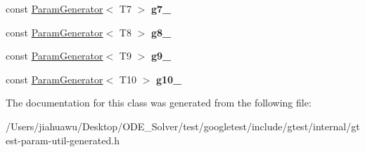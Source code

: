 \begin{DoxyCompactItemize}
const \mbox{\hyperlink{classtesting_1_1internal_1_1_param_generator}{Param\+Generator}}$<$ T7 $>$ {\bfseries g7\+\_\+}
\item 
\mbox{\label{classtesting_1_1internal_1_1_cartesian_product_generator10_a9f76ec8d21d175b1cf85099d548cb456}} 
const \mbox{\hyperlink{classtesting_1_1internal_1_1_param_generator}{Param\+Generator}}$<$ T8 $>$ {\bfseries g8\+\_\+}
\item 
\mbox{\label{classtesting_1_1internal_1_1_cartesian_product_generator10_a0bf21ea47112277221eb91fd19d84512}} 
const \mbox{\hyperlink{classtesting_1_1internal_1_1_param_generator}{Param\+Generator}}$<$ T9 $>$ {\bfseries g9\+\_\+}
\item 
\mbox{\label{classtesting_1_1internal_1_1_cartesian_product_generator10_a1ecc9d1a94a68269677f293d38a99333}} 
const \mbox{\hyperlink{classtesting_1_1internal_1_1_param_generator}{Param\+Generator}}$<$ T10 $>$ {\bfseries g10\+\_\+}
\end{DoxyCompactItemize}


The documentation for this class was generated from the following file\+:\begin{DoxyCompactItemize}
\item 
/\+Users/jiahuawu/\+Desktop/\+O\+D\+E\+\_\+\+Solver/test/googletest/include/gtest/internal/gtest-\/param-\/util-\/generated.\+h\end{DoxyCompactItemize}

